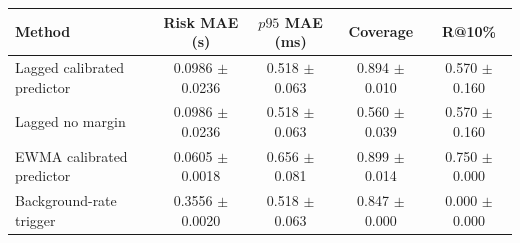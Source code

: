 \begin{tabular}{lcccc}
\hline
Method & Risk MAE (s) & $p95$ MAE (ms) & Coverage & R@10\% \\
\hline
Lagged calibrated predictor & 0.0986 $\pm$ 0.0236 & 0.518 $\pm$ 0.063 & 0.894 $\pm$ 0.010 & 0.570 $\pm$ 0.160 \\
Lagged no margin & 0.0986 $\pm$ 0.0236 & 0.518 $\pm$ 0.063 & 0.560 $\pm$ 0.039 & 0.570 $\pm$ 0.160 \\
EWMA calibrated predictor & 0.0605 $\pm$ 0.0018 & 0.656 $\pm$ 0.081 & 0.899 $\pm$ 0.014 & 0.750 $\pm$ 0.000 \\
Background-rate trigger & 0.3556 $\pm$ 0.0020 & 0.518 $\pm$ 0.063 & 0.847 $\pm$ 0.000 & 0.000 $\pm$ 0.000 \\
\hline
\end{tabular}

